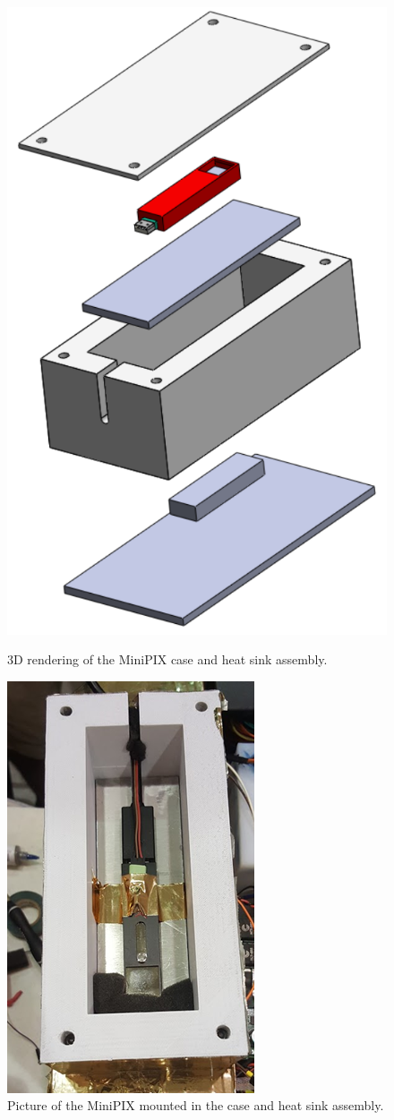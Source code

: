 \begin{figure}[]
  \begin{minipage}[c]{0.49\linewidth}
    \includegraphics[scale=1, width=.5\textwidth]{Figures/Minipix_case_assembly.pdf}
    \caption{3D rendering of the MiniPIX case and heat sink assembly.} %
    \label{fig:case_assem}
  \end{minipage}
  \hfill
  \begin{minipage}[c]{0.49\linewidth}
    \centering
    \includegraphics[scale=1, width=.5\textwidth]{Figures/minipix_mounted.png}
    \caption{Picture of the MiniPIX mounted in the case and heat sink assembly.} %
    \label{fig:case_assem_pic}
  \end{minipage}
\end{figure}

